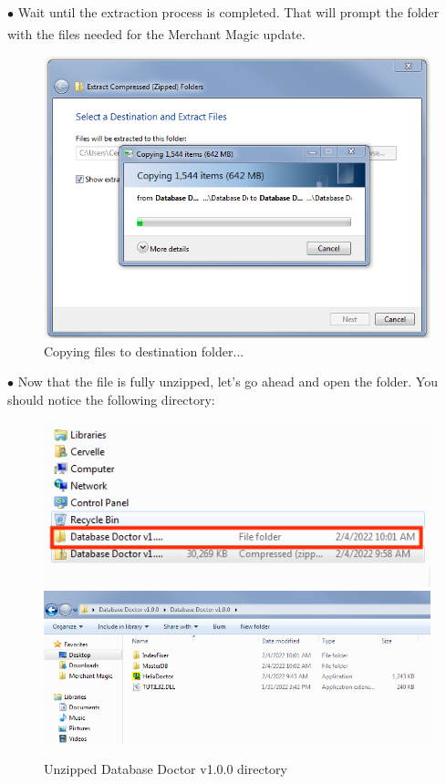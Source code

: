 \documentclass[a4paper, 11pt]{article}
\begin{document}
\pagebreak

\vspace*{\fill}
$\bullet$ Wait until the extraction process is completed. That will prompt the folder with the files needed for the Merchant Magic\textsuperscript{\textregistered} update.

\begin{figure}[h]
    \centering
    \includegraphics[width=\textwidth]{capture 4}
    \caption{Copying files to destination folder...}
\end{figure}
\vspace*{\fill}

\pagebreak

\vspace*{\fill}
$\bullet$ Now that the file is fully unzipped, let's go ahead and open the folder. You should notice the following directory:

\begin{figure}[h]
    \centering
    \includegraphics[width=\textwidth]{capture 5}\\
     \includegraphics[width=\textwidth]{capture 6}
    \caption{Unzipped Database Doctor v1.0.0 directory}
\end{figure}
\vspace*{\fill}
\end{document}

